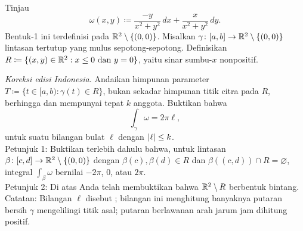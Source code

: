 \begin{exercise}[Sulit]
\pagebreak[2]
Tinjau
\begin{equation*}
\omega(x,y) \coloneqq \frac{-y}{x^2+y^2} \, dx + \frac{x}{x^2+y^2} \, dy .
\end{equation*}
Bentuk-1 ini terdefinisi pada ${\mathbb{R}}^2 \setminus \{ (0,0) \}$. Misalkan
$\gamma \colon [a,b] \to {\mathbb{R}}^2 \setminus \{ (0,0) \}$ lintasan tertutup yang
mulus sepotong-sepotong. Definisikan
$R \coloneqq \{ (x,y) \in {\mathbb{R}}^2 : x \leq 0 \text{ dan } y=0 \}$, yaitu sinar
sumbu-$x$ nonpositif.

\emph{Koreksi edisi Indonesia.} Andaikan himpunan parameter
$T\coloneqq\{t\in[a,b):\gamma(t)\in R\}$, bukan sekadar himpunan titik citra
pada $R$, berhingga dan mempunyai tepat $k$ anggota. Buktikan bahwa
\begin{equation*}
\int_{\gamma} \omega = 2 \pi \ell ,
\end{equation*}
untuk suatu bilangan bulat $\ell$ dengan $\lvert {\ell} \rvert \leq k$.\\
Petunjuk 1: Buktikan terlebih dahulu bahwa, untuk lintasan
$\beta\colon[c,d]\to{\mathbb{R}}^2\setminus\{(0,0)\}$ dengan
$\beta(c),\beta(d)\in R$ dan $\beta((c,d))\cap R=\varnothing$, integral
$\int_{\beta} \omega$ bernilai $-2\pi$, 0, atau $2\pi$.
\\
Petunjuk 2: Di atas Anda telah membuktikan bahwa ${\mathbb{R}}^2 \setminus R$ berbentuk
bintang.
\\
Catatan: Bilangan $\ell$ disebut \emph{}; bilangan ini
menghitung banyaknya putaran bersih $\gamma$ mengelilingi titik asal; putaran
berlawanan arah jarum jam dihitung positif.
\end{exercise}
